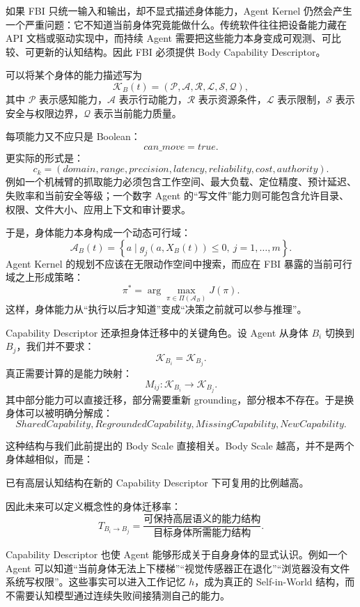 如果 FBI 只统一输入和输出，却不显式描述身体能力，Agent Kernel 仍然会产生一个严重问题：它不知道当前身体究竟能做什么。传统软件往往把设备能力藏在 API 文档或驱动实现中，而持续 Agent 需要把这些能力本身变成可观测、可比较、可更新的认知结构。因此 FBI 必须提供 Body Capability Descriptor。

可以将某个身体的能力描述写为
\[
\mathcal K_B(t)
=
(
\mathcal P,
\mathcal A,
\mathcal R,
\mathcal L,
\mathcal S,
\mathcal Q
),
\]
其中 \(\mathcal P\) 表示感知能力，\(\mathcal A\) 表示行动能力，\(\mathcal R\) 表示资源条件，\(\mathcal L\) 表示限制，\(\mathcal S\) 表示安全与权限边界，\(\mathcal Q\) 表示当前能力质量。

每项能力又不应只是 Boolean：
\[
can\_move=true.
\]
更实际的形式是：
\[
c_k
=
(
domain,
range,
precision,
latency,
reliability,
cost,
authority
).
\]
例如一个机械臂的抓取能力必须包含工作空间、最大负载、定位精度、预计延迟、失败率和当前安全等级；一个数字 Agent 的“写文件”能力则可能包含允许目录、权限、文件大小、应用上下文和审计要求。

于是，身体能力本身构成一个动态可行域：
\[
\mathcal A_B(t)
=
\left\{
a\;|\;
g_j(a,X_B(t))\leq 0,
\ j=1,\ldots,m
\right\}.
\]
Agent Kernel 的规划不应该在无限动作空间中搜索，而应在 FBI 暴露的当前可行域之上形成策略：
\[
\pi^\ast
=
\arg\max_{\pi\in\Pi(\mathcal A_B)}
J(\pi).
\]
这样，身体能力从“执行以后才知道”变成“决策之前就可以参与推理”。

Capability Descriptor 还承担身体迁移中的关键角色。设 Agent 从身体 \(B_i\) 切换到 \(B_j\)，我们并不要求：
\[
\mathcal K_{B_i}
=
\mathcal K_{B_j}.
\]
真正需要计算的是能力映射：
\[
M_{ij}:
\mathcal K_{B_i}
\rightarrow
\mathcal K_{B_j}.
\]
其中部分能力可以直接迁移，部分需要重新 grounding，部分根本不存在。于是换身体可以被明确分解成：
\[
SharedCapability,
RegroundedCapability,
MissingCapability,
NewCapability.
\]

这种结构与我们此前提出的 Body Scale 直接相关。Body Scale 越高，并不是两个身体越相似，而是：
\begin{statementbox}
已有高层认知结构在新的 Capability Descriptor 下可复用的比例越高。
\end{statementbox}
因此未来可以定义概念性的身体迁移率：
\[
T_{B_i\rightarrow B_j}
=
\frac{
\text{可保持高层语义的能力结构}
}{
\text{目标身体所需能力结构}
}.
\]

Capability Descriptor 也使 Agent 能够形成关于自身身体的显式认识。例如一个 Agent 可以知道“当前身体无法上下楼梯”“视觉传感器正在退化”“浏览器没有文件系统写权限”。这些事实可以进入工作记忆 \(h\)，成为真正的 Self-in-World 结构，而不需要认知模型通过连续失败间接猜测自己的能力。

